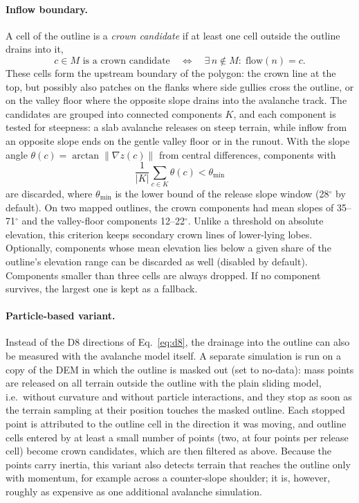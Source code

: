 \paragraph{Inflow boundary.}
A cell of the outline is a \emph{crown candidate} if at least one cell outside
the outline drains into it,
\begin{equation}
  c \in M \text{ is a crown candidate}
  \quad\Longleftrightarrow\quad
  \exists\, n \notin M : \; \mathrm{flow}(n) = c .
  \label{eq:crown}
\end{equation}
These cells form the upstream boundary of the polygon: the crown line at the
top, but possibly also patches on the flanks where side gullies cross the
outline, or on the valley floor where the opposite slope drains into the
avalanche track. The candidates are grouped into connected components $K$, and
each component is tested for steepness: a slab avalanche releases on steep
terrain, while inflow from an opposite slope ends on the gentle valley floor or
in the runout. With the slope angle $\theta(c) = \arctan \lVert \nabla z(c)
\rVert$ from central differences, components with
\begin{equation}
  \frac{1}{|K|} \sum_{c \in K} \theta(c) < \theta_{\min}
  \label{eq:crown_slope}
\end{equation}
are discarded, where $\theta_{\min}$ is the lower bound of the release slope
window (28$^\circ$ by default). On two mapped outlines, the crown components
had mean slopes of 35--71$^\circ$ and the valley-floor components 12--22$^\circ$.
Unlike a threshold on absolute elevation, this criterion keeps secondary crown
lines of lower-lying lobes. Optionally, components whose mean elevation
lies below a given share of the outline's elevation range can be discarded as
well (disabled by default). Components smaller than three cells are always
dropped. If no component survives, the largest one is kept as a fallback.

\paragraph{Particle-based variant.}
Instead of the D8 directions of Eq.~\eqref{eq:d8}, the drainage into the
outline can also be measured with the avalanche model itself. A separate simulation is run
on a copy of the DEM in which the outline is masked out (set to no-data): mass
points are released on all terrain outside the outline with the plain sliding
model, i.e.\ without curvature and without particle interactions, and they
stop as soon as the terrain sampling at their position touches the masked
outline. Each stopped point is attributed to the outline cell in the direction
it was moving, and outline cells entered by at least a small number of points
(two, at four points per release cell) become crown candidates, which are then
filtered as above. Because the points carry inertia, this variant also detects
terrain that reaches the outline only with momentum, for example across a
counter-slope shoulder; it is, however, roughly as expensive as one additional
avalanche simulation.


